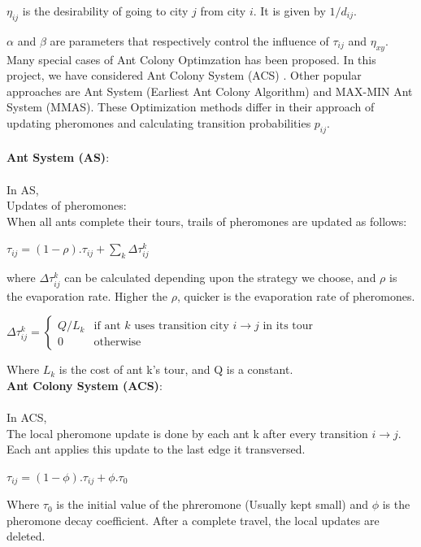 \documentclass[11pt, english]{article}
\begin{document}
\tab  $\eta _{ij}$ is the desirability of going to city ${j}$ from city ${i}$. It is given by ${1/d_{ij}}$.

\tab $\alpha$ and $\beta$ are parameters that respectively control the influence of $\tau_{ij}$ and $\eta _{xy}$.\\

\noindent
Many special cases of Ant Colony Optimzation has been proposed. In this project, we have considered Ant Colony System (ACS) \cite{Dorigo1997}. Other popular approaches are Ant System (Earliest Ant Colony Algorithm)\cite{Dorigo06antcolony} and MAX-MIN Ant System (MMAS)\cite{Sttzle1998}. These Optimization methods differ in their approach of updating pheromones and calculating transition probabilities $p_{ij}$. \\
\\
\noindent
{\bf Ant System (AS)}:\\
\\
In AS,\\
\noindent
Updates of pheromones:\\ 
When all ants complete their tours, trails of pheromones are updated as follows:

\begin{center}
$\tau_{ij} = (1-\rho).\tau_{ij} + \sum_{k}\Delta \tau_{ij}^k$
\end{center}
where $\Delta \tau_{ij}^k$ can be calculated depending upon the strategy we choose, and $\rho$ is the evaporation rate. Higher the $\rho$, quicker is the evaporation rate of pheromones.\\
\begin{center}
$\Delta \tau _{ij}^{k}={\begin{cases}Q/L_{k}&{\mbox{if ant }}k{\mbox{ uses transition city }}i \rightarrow j{\mbox{ in its tour}}\\0&{\mbox{otherwise}}\end{cases}}$\\
\end{center}
\noindent
Where $L_{k}$ is the cost of ant k's tour, and Q is a constant.\\

\noindent
{\bf Ant Colony System (ACS)}: \\
\\
In ACS,\\
The local pheromone update is done by each ant k after every transition $i \rightarrow j$. Each ant applies this update to the last edge it transversed.
\begin{center} {$\tau_{ij} = (1-\phi).\tau_{ij} + \phi.\tau_{0}$} \end{center}
Where $\tau_{0}$ is the initial value of the phreromone (Usually kept small) and $\phi$ is the pheromone decay coefficient. After a complete travel, the local updates are deleted.\cite{Dorigo1997}\\
\end{document}

